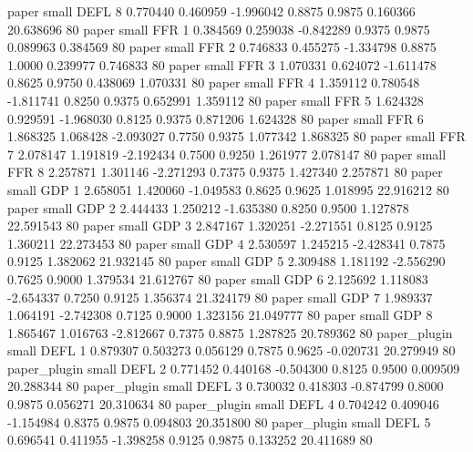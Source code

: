         paper      small     DEFL                 8 0.770440 0.460959 -1.996042 0.8875 0.9875  0.160366   20.638696 80
        paper      small      FFR                 1 0.384569 0.259038 -0.842289 0.9375 0.9875  0.089963    0.384569 80
        paper      small      FFR                 2 0.746833 0.455275 -1.334798 0.8875 1.0000  0.239977    0.746833 80
        paper      small      FFR                 3 1.070331 0.624072 -1.611478 0.8625 0.9750  0.438069    1.070331 80
        paper      small      FFR                 4 1.359112 0.780548 -1.811741 0.8250 0.9375  0.652991    1.359112 80
        paper      small      FFR                 5 1.624328 0.929591 -1.968030 0.8125 0.9375  0.871206    1.624328 80
        paper      small      FFR                 6 1.868325 1.068428 -2.093027 0.7750 0.9375  1.077342    1.868325 80
        paper      small      FFR                 7 2.078147 1.191819 -2.192434 0.7500 0.9250  1.261977    2.078147 80
        paper      small      FFR                 8 2.257871 1.301146 -2.271293 0.7375 0.9375  1.427340    2.257871 80
        paper      small      GDP                 1 2.658051 1.420060 -1.049583 0.8625 0.9625  1.018995   22.916212 80
        paper      small      GDP                 2 2.444433 1.250212 -1.635380 0.8250 0.9500  1.127878   22.591543 80
        paper      small      GDP                 3 2.847167 1.320251 -2.271551 0.8125 0.9125  1.360211   22.273453 80
        paper      small      GDP                 4 2.530597 1.245215 -2.428341 0.7875 0.9125  1.382062   21.932145 80
        paper      small      GDP                 5 2.309488 1.181192 -2.556290 0.7625 0.9000  1.379534   21.612767 80
        paper      small      GDP                 6 2.125692 1.118083 -2.654337 0.7250 0.9125  1.356374   21.324179 80
        paper      small      GDP                 7 1.989337 1.064191 -2.742308 0.7125 0.9000  1.323156   21.049777 80
        paper      small      GDP                 8 1.865467 1.016763 -2.812667 0.7375 0.8875  1.287825   20.789362 80
 paper_plugin      small     DEFL                 1 0.879307 0.503273  0.056129 0.7875 0.9625 -0.020731   20.279949 80
 paper_plugin      small     DEFL                 2 0.771452 0.440168 -0.504300 0.8125 0.9500  0.009509   20.288344 80
 paper_plugin      small     DEFL                 3 0.730032 0.418303 -0.874799 0.8000 0.9875  0.056271   20.310634 80
 paper_plugin      small     DEFL                 4 0.704242 0.409046 -1.154984 0.8375 0.9875  0.094803   20.351800 80
 paper_plugin      small     DEFL                 5 0.696541 0.411955 -1.398258 0.9125 0.9875  0.133252   20.411689 80
